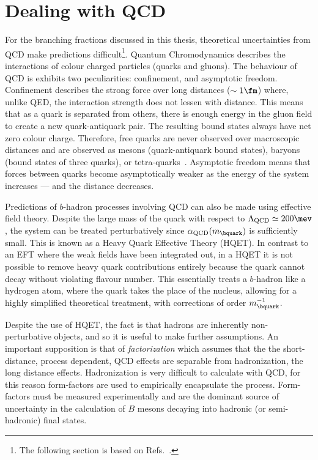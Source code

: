 \section{Dealing with QCD}

For the branching fractions discussed in this thesis, theoretical uncertainties from QCD make
predictions difficult\footnote{
  The following section is based on Refs.~\cite{Pich:1998xt}.
}.
Quantum Chromodynamics describes the interactions of colour charged particles (quarks and
gluons).
The behaviour of QCD is exhibits two peculiarities: confinement, and asymptotic freedom.
Confinement describes the strong force over long distances ($\sim1\fm$)
where, unlike QED, the interaction strength does not lessen with distance.
This means that as a quark is separated from others, there is enough energy in the gluon field to
create a new quark-antiquark pair.
The resulting bound states always have net zero colour charge.
Therefore, free quarks are never observed over macroscopic distances
and are observed as mesons (quark-antiquark bound states), baryons (bound states of
three quarks), or tetra-quarks~\cite{LHCb-PAPER-2014-014}.
Asymptotic freedom means that forces between quarks become asymptotically weaker as the energy of
the system increases --- and the distance decreases.

Predictions of $b$-hadron processes involving QCD can also be made using effective field theory.
Despite the large mass of the \bquark quark with respect to $\Lambda_\mathrm{QCD}\simeq200\mev$,
the system can be treated perturbatively since $\alpha_\mathrm{QCD}(m_\bquark)$ is sufficiently
small.
This is known as a Heavy Quark Effective Theory (HQET).
In contrast to an EFT where the weak fields have been integrated out, in a HQET
it is not possible to remove heavy quark contributions entirely because the \bquark quark
cannot decay without violating flavour number.
This essentially treats a $b$-hadron like a hydrogen atom, where the \bquark quark takes
the place of the nucleus, allowing for a highly simplified theoretical treatment, with corrections
of order $m_\bquark^{-1}$.

Despite the use of HQET, the fact is that hadrons are inherently non-perturbative objects, and so
it is useful to make further assumptions.
An important supposition is that of \emph{factorization} which assumes that the the short-distance,
process dependent, QCD effects are separable from hadronization, the long distance effects.
Hadronization is very difficult to calculate with QCD, for this reason form-factors are used to
empirically encapsulate the process.
Form-factors must be measured experimentally and are the dominant source of uncertainty in the
calculation of $B$ mesons decaying into hadronic (or semi-hadronic) final states.





